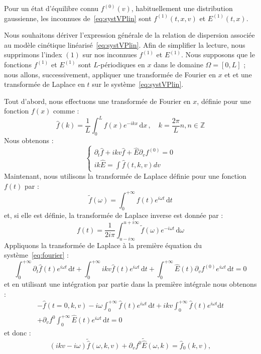 Pour un état d'équilibre connu $f^{(0)}(v)$, habituellement une distribution gaussienne, les inconnues de~\eqref{eq:systVPlin} sont $f^{(1)}(t,x,v)$ et $E^{(1)}(t,x)$.

Nous souhaitons dériver l'expression générale de la relation de dispersion associée au modèle cinétique linéarisé~\eqref{eq:systVPlin}. Afin de simplifier la lecture, nous supprimons l'index $(1)$ sur nos inconnues $f^{(1)}$ et $E^{(1)}$. Nous supposons que le fonctions $f^{(1)}$ et $E^{(1)}$ sont $L$-périodiques en $x$ dans le domaine $\Omega=[0,L]$ ; nous allons, successivement, appliquer une transformée de Fourier en $x$ et et une transformée de Laplace en $t$ sur le système~\eqref{eq:systVPlin}.

Tout d'abord, nous effectuons une transformée de Fourier en $x$, définie pour une fonction $f(x)$ comme :
$$
  \hat{f}(k) = \frac{1}{L}\int_0^L f(x)e^{-ikx}\,\mathrm{d}x\,,\quad k=\frac{2\pi}{L}n, n\in\mathbb{Z}
$$
Nous obtenons :
\begin{equation}
  \begin{cases}
    \partial_t \hat{f} + ikv\hat{f} + \hat{E}\partial_v f^{(0)} = 0 \\
    ik\hat{E} = \int \hat{f}(t,k,v) dv
  \end{cases}
  \label{eq:fourier}
\end{equation}
Maintenant, nous utilisons la transformée de Laplace définie pour une fonction $f(t)$ par :
$$
  \tilde{f}(\omega) = \int_0^{+\infty} f(t)e^{i\omega t}\,\mathrm{d}t
$$
et, si elle est définie, la transformée de Laplace inverse est donnée par :
$$
  f(t) = \frac{1}{2i\pi}\int_{u-i\infty}^{u+i\infty} \tilde{f}(\omega)e^{-i\omega t}\,\mathrm{d}\omega
$$
Appliquons la transformée de Laplace à la première équation du système~\eqref{eq:fourier} :
$$
  \int_0^{+\infty}\partial_t\hat{f}(t)e^{i\omega t}\,\mathrm{d}t
  + \int_0^{+\infty}ikv\hat{f}(t)e^{i\omega t}\,\mathrm{d}t
  + \int_0^{+\infty}\hat{E}(t)\partial_v f^{(0)}e^{i\omega t}\,\mathrm{d}t
  = 0
$$
et en utilisant une intégration par partie dans la première intégrale nous obtenons :
$$
  \begin{aligned}
    -\hat{f}(t=0,k,v) - i\omega\int_0^{+\infty} \hat{f}(t)e^{i\omega t}\,\mathrm{d}t + ikv\int_0^{+\infty} \hat{f}(t)e^{i\omega t} \mathrm{d}t \\
    +\partial_vf^0\int_0^{+\infty}\hat{E}(t)e^{i\omega t}\,\mathrm{d}t=0
  \end{aligned}
$$
et donc :
\begin{equation}
  (ikv-i\omega)\tilde{\hat{f}}(\omega,k,v) + \partial_vf^0\tilde{\hat{E}}(\omega,k) = \hat{f}_0(k,v),
  \label{eq:fourierlaplace_f}
\end{equation}

